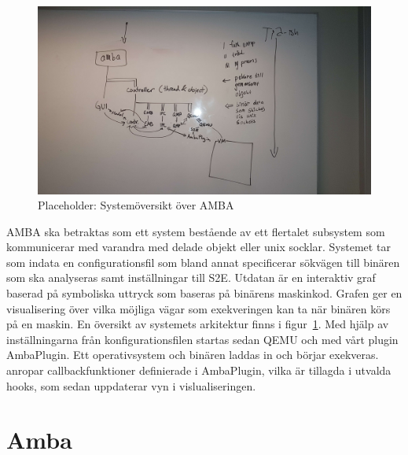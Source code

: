 


\begin{figure}
    \centering
    \includegraphics[width=\textwidth]{figures/arkitektur.jpg}
    \caption{Placeholder: Systemöversikt över AMBA}\label{fig:arkitektur}
\end{figure}

%

AMBA ska betraktas som ett system bestående av ett flertalet subsystem
som kommunicerar med varandra med delade objekt eller unix socklar.
Systemet tar som indata en configurationsfil som bland annat
specificerar sökvägen till binären som ska analyseras samt
inställningar till S2E.  Utdatan är en interaktiv graf baserad på
symboliska uttryck som baseras på binärens maskinkod.  Grafen ger en
visualisering över vilka möjliga vägar som exekveringen kan ta när
binären körs på en maskin.  En översikt av systemets arkitektur finns
i figur~\ref{fig:arkitektur}.  Med hjälp av inställningarna från
konfigurationsfilen startas sedan QEMU och \stoe{} med vårt \stoe{} plugin
AmbaPlugin.  Ett operativsystem och binären laddas in och börjar
exekveras. \stoe{} anropar callbackfunktioner definierade i
AmbaPlugin, vilka är tillagda i utvalda \stoe{} hooks, som sedan
uppdaterar vyn i vislualiseringen.

\section{Amba}


